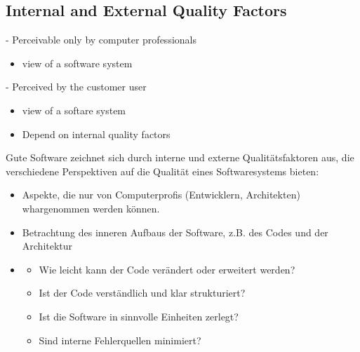 \subsection{Internal and External Quality Factors}
\begin{defBox}[title=What is good software?]
     - Perceivable only by computer professionals
    \begin{itemize}
        \item {} view of a software system
    \end{itemize}
     - Perceived by the customer \/ user
    \begin{itemize}
        \item {} view of a softare system
        \item Depend on internal quality factors
    \end{itemize}
\end{defBox}
\begin{infoBox}[title=Was ist gute Software?]
    Gute Software zeichnet sich durch interne und externe Qualitätsfaktoren aus, die verschiedene Perspektiven auf die Qualität eines Softwaresystems bieten:
\end{infoBox}
\begin{infoBox}[title=Interne Qualitätsfaktoren]
    \begin{itemize}
        \item {} Aspekte, die nur von Computerprofis (Entwicklern, Architekten) whargenommen werden können.
        \item {} Betrachtung des inneren Aufbaus der Software, z.B. des Codes und der Architektur
        \item {}
        \begin{itemize}
            \item {} Wie leicht kann der Code verändert oder erweitert werden?
            \item {} Ist der Code verständlich und klar strukturiert?
            \item {} Ist die Software in sinnvolle Einheiten zerlegt?
            \item {} Sind interne Fehlerquellen minimiert?
        \end{itemize}
    \end{itemize}
\end{infoBox}
